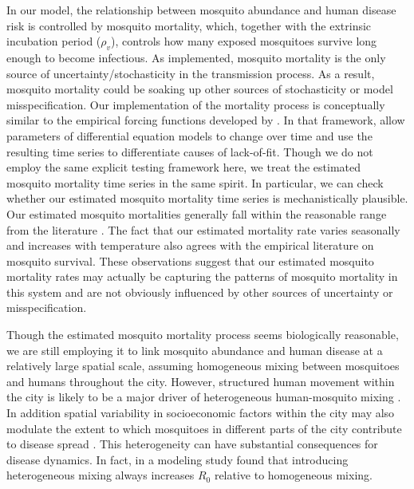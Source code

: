 \documentclass[10pt,letterpaper]{article}
\begin{document}
In our model, the relationship between mosquito abundance and human disease risk is controlled by mosquito mortality, which, together with the extrinsic incubation period ($\rho_v$), controls how  many exposed mosquitoes survive long enough to become infectious.
As implemented, mosquito mortality is the only source of uncertainty/stochasticity in the transmission process.
As a result, mosquito mortality could be soaking up other sources of stochasticity or model misspecification.
Our implementation of the mortality process is conceptually similar to the empirical forcing functions developed by \cite{Hooker2015}.
In that framework, \cite{Hooker2015} allow parameters of differential equation models to change over time and use the resulting time series to differentiate causes of lack-of-fit.
Though we do not employ the same explicit testing framework here, we treat the estimated mosquito mortality time series in the same spirit.
In particular, we can check whether our estimated mosquito mortality time series is mechanistically plausible.
Our estimated mosquito mortalities generally fall within the reasonable range from the literature \cite{Maciel-de-Freitas2008, Brady2013}.
The fact that our estimated mortality rate varies seasonally and increases with temperature also agrees with the empirical literature on mosquito survival.
These observations suggest that our estimated mosquito mortality rates may actually be capturing the patterns of mosquito mortality in this system and are not obviously influenced by other sources of uncertainty or misspecification.

Though the estimated mosquito mortality process seems biologically reasonable, we are still employing it to link mosquito abundance and human disease at a relatively large spatial scale, assuming homogeneous mixing between mosquitoes and humans throughout the city.
However, structured human movement within the city is likely to be a major driver of heterogeneous human-mosquito mixing \cite{Adams2009, Cosner2009a, Stoddard2009, Dalziel2013}.
In addition spatial variability in socioeconomic factors within the city may also modulate the extent to which mosquitoes in different parts of the city contribute to disease spread \cite{Mondini2008, Honorio2009, Hu2012, DeMattosAlmeida2007}.
This heterogeneity can have substantial consequences for disease dynamics.
In fact, in a modeling study \cite{Dye1986, Hasibeder1988} found that introducing heterogeneous mixing always increases $R_0$ relative to homogeneous mixing.
\end{document}
